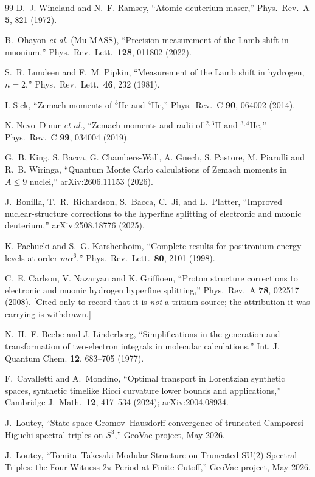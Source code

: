 \documentclass[11pt]{article}
\begin{document}
\begin{thebibliography}{99}
D.~J. Wineland and N.~F. Ramsey,
``Atomic deuterium maser,''
Phys.\ Rev.\ A \textbf{5}, 821 (1972).

B.~Ohayon \emph{et al.} (Mu-MASS),
``Precision measurement of the Lamb shift in muonium,''
Phys.\ Rev.\ Lett.\ \textbf{128}, 011802 (2022).

S.~R. Lundeen and F.~M. Pipkin,
``Measurement of the Lamb shift in hydrogen, $n = 2$,''
Phys.\ Rev.\ Lett.\ \textbf{46}, 232 (1981).

I. Sick,
``Zemach moments of $^3$He and $^4$He,''
Phys.\ Rev.\ C \textbf{90}, 064002 (2014).

N. Nevo~Dinur \emph{et al.},
``Zemach moments and radii of $^{2,3}$H and $^{3,4}$He,''
Phys.\ Rev.\ C \textbf{99}, 034004 (2019).

G.~B. King, S. Bacca, G. Chambers-Wall, A. Gnech, S. Pastore, M. Piarulli
and R.~B. Wiringa,
``Quantum Monte Carlo calculations of Zemach moments in $A \leq 9$ nuclei,''
arXiv:2606.11153 (2026).

J.~Bonilla, T.~R.~Richardson, S.~Bacca, C.~Ji, and L.~Platter,
``Improved nuclear-structure corrections to the hyperfine splitting of
electronic and muonic deuterium,''
arXiv:2508.18776 (2025).

K. Pachucki and S.~G. Karshenboim,
``Complete results for positronium energy levels at order $m\alpha^6$,''
Phys.\ Rev.\ Lett.\ \textbf{80}, 2101 (1998).

C.~E. Carlson, V. Nazaryan and K. Griffioen,
``Proton structure corrections to electronic and muonic hydrogen hyperfine
splitting,''
Phys.\ Rev.\ A \textbf{78}, 022517 (2008).
[Cited only to record that it is \emph{not} a tritium source; the
attribution it was carrying is withdrawn.]

N.~H.~F. Beebe and J. Linderberg,
``Simplifications in the generation and transformation of two-electron
integrals in molecular calculations,''
Int. J. Quantum Chem. \textbf{12}, 683--705 (1977).

F.~Cavalletti and A.~Mondino,
``Optimal transport in Lorentzian synthetic spaces, synthetic timelike
Ricci curvature lower bounds and applications,''
Cambridge J.\ Math.\ \textbf{12}, 417--534 (2024); arXiv:2004.08934.

J.~Loutey, ``State-space Gromov--Hausdorff convergence of truncated Camporesi--Higuchi spectral triples on $S^3$,'' GeoVac project, May 2026.

J.~Loutey, ``Tomita--Takesaki Modular Structure on Truncated SU(2)
Spectral Triples: the Four-Witness $2\pi$ Period at Finite Cutoff,''
GeoVac project, May 2026.

\end{thebibliography}
\end{document}
